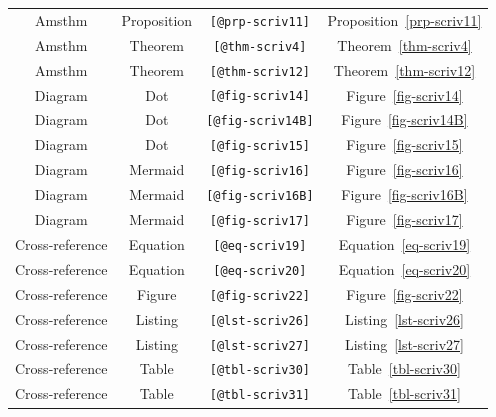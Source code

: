 \documentclass[
  12pt,
  a4paper,
  oneside,
  numbers=noenddot,
  titlepage,
  toclink=all,
  toc=bibliography]{scrbook}
\theoremstyle{definition}
\theoremstyle{definition}
\theoremstyle{definition}
\theoremstyle{plain}
\theoremstyle{plain}
\theoremstyle{plain}
\theoremstyle{plain}
\theoremstyle{plain}
\theoremstyle{remark}
\begin{document}
\begin{longtable}[]{@{}cccc@{}}
Amsthm & Proposition & \texttt{{[}@prp-scriv11{]}} &
\protect\hypertarget{cite_22}{}{\label{cite_22}Proposition~\ref{prp-scriv11}} \\
Amsthm & Theorem & \texttt{{[}@thm-scriv4{]}} &
\protect\hypertarget{cite_23}{}{\label{cite_23}Theorem~\ref{thm-scriv4}} \\
Amsthm & Theorem & \texttt{{[}@thm-scriv12{]}} &
\protect\hypertarget{cite_24}{}{\label{cite_24}Theorem~\ref{thm-scriv12}} \\
Diagram & Dot & \texttt{{[}@fig-scriv14{]}} &
\protect\hypertarget{cite_25}{}{\label{cite_25}Figure~\ref{fig-scriv14}} \\
Diagram & Dot & \texttt{{[}@fig-scriv14B{]}} &
\protect\hypertarget{cite_26}{}{\label{cite_26}Figure~\ref{fig-scriv14B}} \\
Diagram & Dot & \texttt{{[}@fig-scriv15{]}} &
\protect\hypertarget{cite_27}{}{\label{cite_27}Figure~\ref{fig-scriv15}} \\
Diagram & Mermaid & \texttt{{[}@fig-scriv16{]}} &
\protect\hypertarget{cite_28}{}{\label{cite_28}Figure~\ref{fig-scriv16}} \\
Diagram & Mermaid & \texttt{{[}@fig-scriv16B{]}} &
\protect\hypertarget{cite_29}{}{\label{cite_29}Figure~\ref{fig-scriv16B}} \\
Diagram & Mermaid & \texttt{{[}@fig-scriv17{]}} &
\protect\hypertarget{cite_30}{}{\label{cite_30}Figure~\ref{fig-scriv17}} \\
Cross-reference & Equation & \texttt{{[}@eq-scriv19{]}} &
\protect\hypertarget{cite_31}{}{\label{cite_31}Equation~\ref{eq-scriv19}} \\
Cross-reference & Equation & \texttt{{[}@eq-scriv20{]}} &
\protect\hypertarget{cite_32}{}{\label{cite_32}Equation~\ref{eq-scriv20}} \\
Cross-reference & Figure & \texttt{{[}@fig-scriv22{]}} &
\protect\hypertarget{cite_33}{}{\label{cite_33}Figure~\ref{fig-scriv22}} \\
Cross-reference & Listing & \texttt{{[}@lst-scriv26{]}} &
\protect\hypertarget{cite_34}{}{\label{cite_34}Listing~\ref{lst-scriv26}} \\
Cross-reference & Listing & \texttt{{[}@lst-scriv27{]}} &
\protect\hypertarget{cite_35}{}{\label{cite_35}Listing~\ref{lst-scriv27}} \\
Cross-reference & Table & \texttt{{[}@tbl-scriv30{]}} &
\protect\hypertarget{cite_36}{}{\label{cite_36}Table~\ref{tbl-scriv30}} \\
Cross-reference & Table & \texttt{{[}@tbl-scriv31{]}} &
\protect\hypertarget{cite_37}{}{\label{cite_37}Table~\ref{tbl-scriv31}} \\

\end{longtable}
\end{document}
